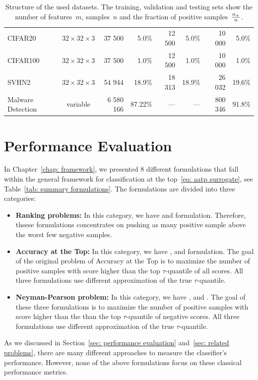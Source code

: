 \begin{table}[!ht]
{\begin{NiceTabular}{lcrrrrrr}
    CIFAR20
      & $32 \times 32 \times 3$
      & 37 500
      & 5.0\%
      & 12 500
      & 5.0\%
      & 10 000
      & 5.0\% \\
    CIFAR100
      & $32 \times 32 \times 3$
      & 37 500
      & 1.0\%
      & 12 500
      & 1.0\%
      & 10 000
      & 1.0\% \\
    SVHN2
      & $32 \times 32\times 3$
      & 54 944
      & 18.9\%
      & 18 313
      & 18.9\%
      & 26 032
      & 19.6\% \\
    \midrule
    Malware Detection
      & variable
      & 6 580 166
      & 87.22\%
      & ---
      & ---
      & 800 346
      & 91.8\% \\
    \bottomrule
  \end{NiceTabular}
  }
  \caption{Structure of the used datasets. The training, validation and testing sets show the number of features~$m$, samples~$n$ and the fraction of positive samples~$\frac{n_{+}}{n}$.}
  \label{tab: datasets summary}
\end{table}

\section{Performance Evaluation}

In Chapter~\ref{chap: framework}, we presented 8 different formulations that fall within the general framework for classification at the top~\eqref{eq: aatp surrogate}, see Table~\ref{tab: summary formulations}. The formulations are divided into three categories:
\begin{itemize}
  \item \textbf{Ranking problems:} In this category, we have \TopPush and \TopPushK formulation. Therefore, thsese formulations concentrates on pushing as many positive sample above the worst few negative samples.
  \item \textbf{Accuracy at the Top:} In this category, we have \Grill, \TopMeanK and \PatMat formulation. The goal of the original problem of Accuracy at the Top is to maximize the number of positive samples with score higher than the top $\tau$-quantile of all scores. All three formulations use different approximation of the true $\tau$-quantile.
  \item \textbf{Neyman-Pearson problem:} In this category, we have \GrillNP, \tauFPL and \PatMatNP. The goal of these three formulations is to maximize the number of positive samples with score higher than the than the top $\tau$-quantile of negative scores. All three formulations use different approximation of the true $\tau$-quantile.
\end{itemize}
As we discussed in Section~\ref{sec: performance evaluation} and~\ref{sec: related problems}, there are many different approaches to measure the classifier’s performance. However, none of the above formulations focus on these classical performance metrics.

